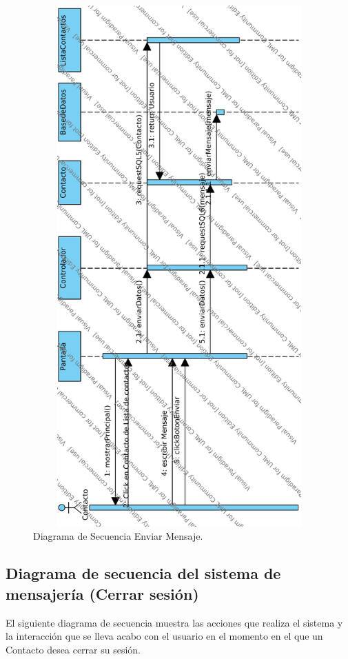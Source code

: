 		\begin{figure}[htbp!]
		\centering
			\includegraphics[width=15cm, height=20cm]{images/Diagramas/SecEnviar}
		\caption{Diagrama de Secuencia Enviar Mensaje.}
	\end{figure}
		\pagebreak
	\subsection{Diagrama de secuencia del sistema de mensajer\'ia (Cerrar sesi\'on)}
El siguiente diagrama de secuencia muestra las acciones que realiza el sistema y la interacci\'on que se lleva acabo con el usuario en el momento en el que un Contacto desea cerrar su sesi\'on.
	
